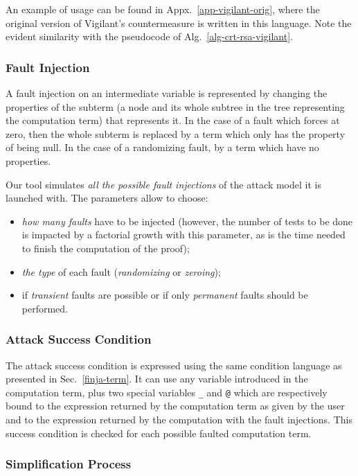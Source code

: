 \documentclass[10pt]{article}
\theoremstyle{definition}
\theoremstyle{theorem}
\begin{document}
\medskip

An example of usage can be found in Appx.~\ref{app-vigilant-orig}, where the original version of Vigilant's countermeasure is written in this language.
Note the evident similarity with the pseudocode of Alg.~\ref{alg-crt-rsa-vigilant}.

\subsubsection{Fault Injection}
\label{finja-fi}

A fault injection on an intermediate variable is represented by changing the properties of the subterm (a node and its whole subtree in the tree representing the computation term) that represents it.
In the case of a fault which forces at zero, then the whole subterm is replaced by a term which only has the property of being null.
In the case of a randomizing fault, by a term which have no properties.

Our tool simulates \emph{all the possible fault injections} of the attack model it is launched with.
The parameters allow to choose:
\begin{itemize}
\item \emph{how many faults} have to be injected (however, the number of tests to be done is impacted by a factorial growth with this parameter, as is the time needed to finish the computation of the proof);
\item \emph{the type} of each fault (\emph{randomizing} or \emph{zeroing});
\item if \emph{transient} faults are possible or if only \emph{permanent} faults should be performed.
\end{itemize}

\subsubsection{Attack Success Condition}
\label{finja-asc}

The attack success condition is expressed using the same condition language as presented in Sec.~\ref{finja-term}.
It can use any variable introduced in the computation term, plus two special variables {\tt \_} and {\tt @} which are respectively bound to the expression returned by the computation term as given by the user and to the expression returned by the computation with the fault injections.
This success condition is checked for each possible faulted computation term.

\subsubsection{Simplification Process}
\label{finja-reduce}
\end{document}
